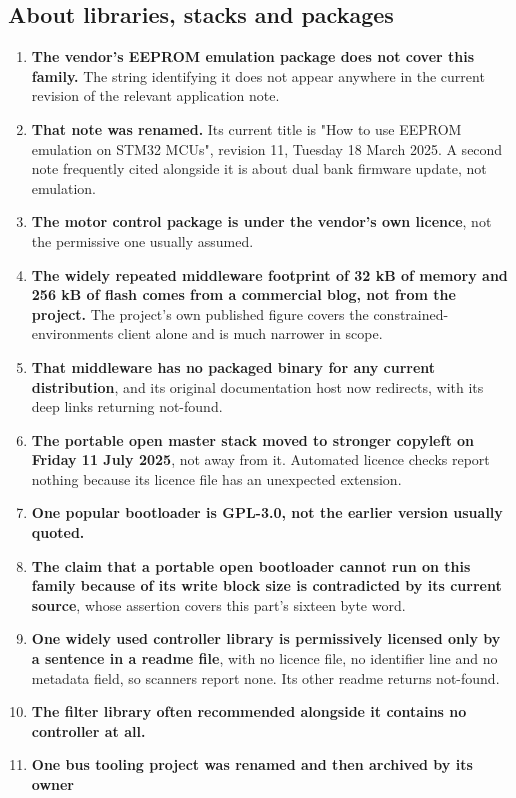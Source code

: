 \subsection*{About libraries, stacks and packages}

\begin{enumerate}[resume,itemsep=2pt]
\item \textbf{The vendor's EEPROM emulation package does not cover this
family.} The string identifying it does not appear anywhere in the current
revision of the relevant application note.
\item \textbf{That note was renamed.} Its current title is "How to use EEPROM
emulation on STM32 MCUs", revision 11, Tuesday 18 March 2025. A second note
frequently cited alongside it is about dual bank firmware update, not emulation.
\item \textbf{The motor control package is under the vendor's own licence}, not
the permissive one usually assumed.
\item \textbf{The widely repeated middleware footprint of 32 kB of memory and
256 kB of flash comes from a commercial blog, not from the project.} The
project's own published figure covers the constrained-environments client alone
and is much narrower in scope.
\item \textbf{That middleware has no packaged binary for any current
distribution}, and its original documentation host now redirects, with its deep
links returning not-found.
\item \textbf{The portable open master stack moved to stronger copyleft on
Friday 11 July 2025}, not away from it. Automated licence checks report nothing
because its licence file has an unexpected extension.
\item \textbf{One popular bootloader is GPL-3.0, not the earlier version usually
quoted.}
\item \textbf{The claim that a portable open bootloader cannot run on this
family because of its write block size is contradicted by its current source},
whose assertion covers this part's sixteen byte word.
\item \textbf{One widely used controller library is permissively licensed only
by a sentence in a readme file}, with no licence file, no identifier line and no
metadata field, so scanners report none. Its other readme returns not-found.
\item \textbf{The filter library often recommended alongside it contains no
controller at all.}
\item \textbf{One bus tooling project was renamed and then archived by its owner
}
\end{enumerate}
